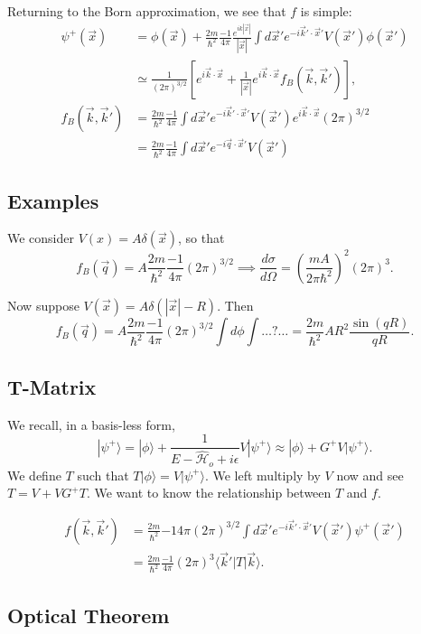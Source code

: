 \documentclass[fontsize=12pt]{scrartcl}
\newcommand{\la}{\langle}
\newcommand{\ra}{\rangle}
\newcommand{\Ham}{\hat{\mathcal{H}}}
\begin{document}
Returning to the Born approximation, we see that $f$ is simple: \begin{align*}
\psi^+(\vec{x})&=\phi(\vec{x})+\frac{2m}{\hbar^2}\frac{-1}{4\pi}\frac{e^{ik|\vec{x}|}}{|\vec{x}|} \int d\vec{x}' e^{-i\vec{k}'\cdot\vec{x}'} V(\vec{x}')\phi(\vec{x}')\\
&\simeq \frac{1}{(2\pi)^{3/2}}\left[e^{i\vec{k}\cdot\vec{x}}+\frac{1}{|\vec{x}|} e^{i\vec{k}\cdot\vec{x}}f_B(\vec{k},\vec{k}')\right],\\
f_B(\vec{k},\vec{k}') &= \frac{2m}{\hbar^2}\frac{-1}{4\pi} \int d\vec{x}' e^{-i\vec{k}'\cdot\vec{x}'}V(\vec{x}')e^{i\vec{k}\cdot\vec{x}}(2\pi)^{3/2}\\ &= \frac{2m}{\hbar^2}\frac{-1}{4\pi} \int d\vec{x}' e^{-i\vec{q}\cdot\vec{x}'}V(\vec{x}')
\end{align*}

\subsection{Examples}

We consider $V(x)=A\delta(\vec{x})$, so that $$f_B(\vec{q}) = A\frac{2m}{\hbar^2}\frac{-1}{4\pi}(2\pi)^{3/2}\implies \frac{d\sigma}{d\Omega} = \left(\frac{mA}{2\pi\hbar^2}\right)^2 (2\pi)^3.$$

Now suppose $V(\vec{x}) = A\delta(|\vec{x}|-R).$ Then $$f_B(\vec{q}) = A\frac{2m}{\hbar^2}\frac{-1}{4\pi}(2\pi)^{3/2}\int d\phi \int \dots ? \dots = \frac{2m}{\hbar^2}AR^2 \frac{\sin(qR)}{qR}.$$ 

\subsection{T-Matrix}

We recall, in a basis-less form, $$|\psi^+\ra = |\phi\ra + \frac{1}{E-\Ham_o+i\epsilon}V|\psi^+\ra\approx |\phi\ra + G^+V|\psi^+\ra.$$ We define $T$ such that $T|\phi\ra = V|\psi^+\ra$. We left multiply by $V$ now and see $T = V+VG^+ T.$ We want to know the relationship between $T$ and $f$.

\begin{align*}
f(\vec{k},\vec{k}')&=\frac{2m}{\hbar^2}{-1}{4\pi}(2\pi)^{3/2}\int d\vec{x}' e^{-i\vec{k}'\cdot\vec{x}'} V(\vec{x}')\psi^+(\vec{x}')\\
&= \frac{2m}{\hbar^2}\frac{-1}{4\pi} (2\pi)^3 \la \vec{k}'|T|\vec{k}\ra.
\end{align*}


\subsection{Optical Theorem}
\end{document}
